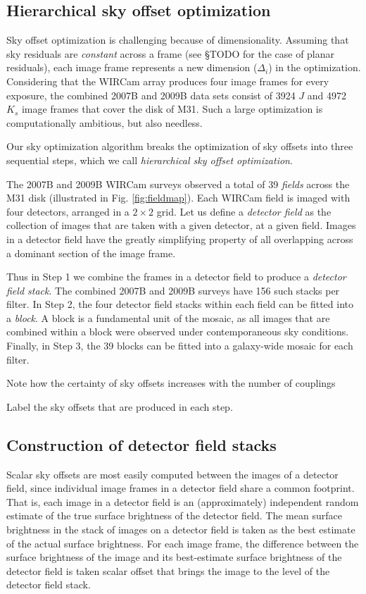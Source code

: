 \documentclass[iop]{emulateapj}
\newcommand{\todo}[1]{\textcolor{RedOrange}{#1}} %
\begin{document}
\subsection{Hierarchical sky offset optimization}

Sky offset optimization is challenging because of dimensionality. Assuming that sky residuals are \emph{constant} across a frame (see \S TODO for the case of planar residuals), each image frame represents a new dimension ($\Delta_i$) in the optimization. Considering that the WIRCam array produces four image frames for every exposure, the combined 2007B and 2009B data sets consist of 3924 $J$ and 4972 $K_s$ image frames that cover the disk of M31. Such a large optimization is computationally ambitious, but also needless.

Our sky optimization algorithm breaks the optimization of sky offsets into three sequential steps, which we call \emph{hierarchical sky offset optimization}.

The 2007B and 2009B WIRCam surveys observed a total of 39 \emph{fields} across the M31 disk (illustrated in Fig. \ref{fig:fieldmap}). Each WIRCam field is imaged with four detectors, arranged in a $2\times 2$ grid. Let us define a \emph{detector field} as the collection of images that are taken with a given detector, at a given field. Images in a detector field have the greatly simplifying property of all overlapping across a dominant section of the image frame.

Thus in Step 1 we combine the frames in a detector field to produce a \emph{detector field stack}. The combined 2007B and 2009B surveys have 156 such stacks per filter. In Step 2, the four detector field stacks within each field can be fitted into a \emph{block}. A block is a fundamental unit of the mosaic, as all images that are combined within a block were observed under contemporaneous sky conditions. Finally, in Step 3, the 39 blocks can be fitted into a galaxy-wide mosaic for each filter.

\todo{Note how the certainty of sky offsets increases with the number of couplings}

\todo{Label the sky offsets that are produced in each step.}

\subsection{Construction of detector field stacks}
\label{sec:stacks}

Scalar sky offsets are most easily computed between the images of a detector field, since individual image frames in a detector field share a common footprint. That is, each image in a detector field is an (approximately) independent random estimate of the true surface brightness of the detector field. The mean surface brightness in the stack of images on a detector field is taken as the best estimate of the actual surface brightness. For each image frame, the difference between the surface brightness of the image and its best-estimate surface brightness of the detector field is taken scalar offset that brings the image to the level of the detector field stack.
\end{document}
